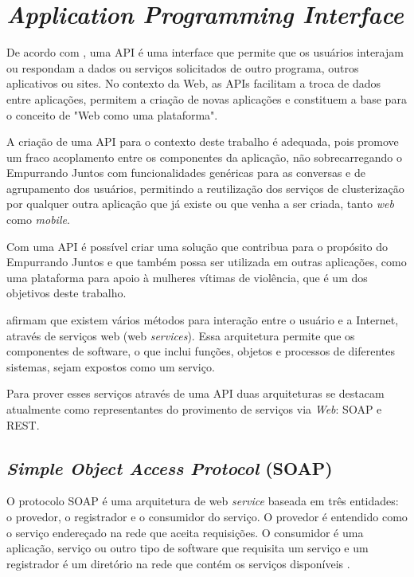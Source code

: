 \chapter{\textit{Application Programming Interface}} \label{cap:api}

De acordo com , uma API é uma interface que permite que os 
usuários interajam ou respondam a dados ou serviços solicitados de outro programa, outros
aplicativos ou sites. No contexto da Web, as APIs facilitam a troca de dados entre 
aplicações, permitem a criação de novas aplicações e constituem a base para o conceito de 
"Web como uma plataforma".

A criação de uma API para o contexto deste trabalho é adequada, pois promove um fraco acoplamento
entre os componentes da aplicação, não sobrecarregando o Empurrando Juntos com funcionalidades genéricas
para as conversas e de agrupamento dos usuários,
permitindo a reutilização dos serviços de clusterização por qualquer
outra aplicação que já existe ou que venha a ser criada, tanto \textit{web} como \textit{mobile}.

Com uma API é possível criar uma solução que contribua para o propósito do Empurrando Juntos e que também
possa ser utilizada em outras aplicações, como uma plataforma para apoio à mulheres vítimas de violência, que é
um dos objetivos deste trabalho.

 afirmam que existem vários métodos para interação entre o  
usuário e a Internet, através de serviços web (web \textit{services}).
Essa arquitetura permite que os componentes de software, o que inclui funções,
objetos e processos de diferentes sistemas, sejam expostos como um serviço.

Para prover esses serviços através de uma API duas arquiteturas se destacam atualmente como representantes do provimento
de serviços via \textit{Web}: SOAP e REST.

\section{\textit{Simple Object Access Protocol} (SOAP)}

O protocolo SOAP é uma arquitetura de web \textit{service} baseada em três entidades: o provedor, o registrador e o consumidor do serviço. O provedor é entendido como o serviço endereçado na rede
que aceita requisições. O consumidor é uma aplicação, serviço ou outro tipo de software que
requisita um serviço e um registrador é um diretório na rede que contém os serviços disponíveis \cite{mumbaikar}.

